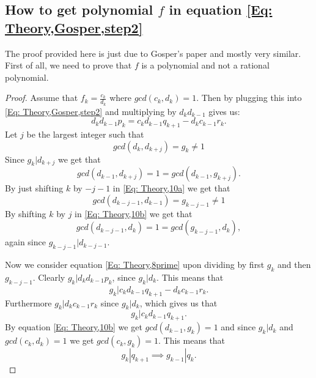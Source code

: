 \subsection{How to get polynomial $f$ in equation \ref{Eq: Theory,Gosper,step2}}
The proof provided here is just due to Gosper's paper and mostly very similar. First of all, we need to prove that $f$ is a polynomial and not a rational polynomial.
\begin{proof}
  Assume that $f_k=\frac{c_k}{d_k}$ where $gcd(c_k,d_k)=1$. Then by plugging this into \ref{Eq: Theory,Gosper,step2} and multiplying by $d_kd_{k-1}$ gives us:
  \begin{equation}\label{Eq: Theory,8prime}
    d_kd_{k-1}p_k = c_kd_{k-1}q_{k+1} - d_kc_{k-1}r_k.
  \end{equation}
  Let $j$ be the largest integer such that
  \begin{equation}\label{Eq: Theory,10a}
    gcd(d_k,d_{k+j})=g_k\neq 1
  \end{equation}
  Since $g_k|d_{k+j}$ we get that
  \begin{equation}\label{Eq: Theory,10b}
    gcd(d_{k-1},d_{k+j})=1=gcd(d_{k-1},g_{k+j}).
  \end{equation}
  By just shifting $k$ by $-j-1$ in \ref{Eq: Theory,10a} we get that
  \begin{equation}\label{Eq: Theory,10c}
    gcd(d_{k-j-1},d_{k-1})=g_{k-j-1}\neq 1
  \end{equation}
  By shifting $k$ by $j$ in \ref{Eq: Theory,10b} we get that
  \begin{equation}\label{Eq: Theory,10d}
    gcd(d_{k-j-1},d_k) = 1 = gcd(g_{k-j-1},d_k),
  \end{equation}
  again since $g_{k-j-1}|d_{k-j-1}$.

  Now we consider equation \ref{Eq: Theory,8prime} upon dividing by first $g_k$ and then $g_{k-j-1}$. Clearly $g_k|d_kd_{k-1}p_k$, since $g_k|d_k$. This means that
  \begin{equation}
    g_k|c_kd_{k-1}q_{k+1}-d_kc_{k-1}r_k.
  \end{equation}
  Furthermore $g_k|d_kc_{k-1}r_k$ since $g_k|d_k$, which gives us that
  \begin{equation}
    g_k|c_kd_{k-1}q_{k+1}.
  \end{equation}
  By equation \ref{Eq: Theory,10b} we get $gcd(d_{k-1},g_k)=1$ and since $g_k|d_k$ and $gcd(c_k,d_k)=1$ we get $gcd(c_k,g_k)=1$. This means that
  \begin{equation}
    g_k|q_{k+1} \implies g_{k-1}|q_k.
  \end{equation}


\end{proof}
